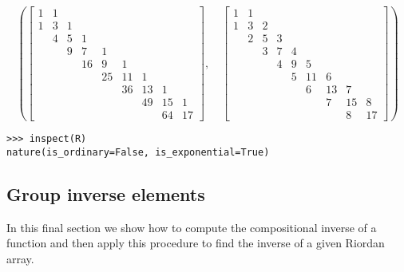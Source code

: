 \begin{example}
\begin{displaymath}
\left ( \left[\begin{matrix}1 & 1 &   &   &   &   &   &   &  \\1 & 3 & 1 &   &   &   &   &   &  \\  & 4 & 5 & 1 &   &   &   &   &  \\  &   & 9 & 7 & 1 &   &   &   &  \\  &   &   & 16 & 9 & 1 &   &   &  \\  &   &   &   & 25 & 11 & 1 &   &  \\  &   &   &   &   & 36 & 13 & 1 &  \\  &   &   &   &   &   & 49 & 15 & 1\\  &   &   &   &   &   &   & 64 & 17\end{matrix}\right], \quad \left[\begin{matrix}1 & 1 &   &   &   &   &   &   &  \\1 & 3 & 2 &   &   &   &   &   &  \\  & 2 & 5 & 3 &   &   &   &   &  \\  &   & 3 & 7 & 4 &   &   &   &  \\  &   &   & 4 & 9 & 5 &   &   &  \\  &   &   &   & 5 & 11 & 6 &   &  \\  &   &   &   &   & 6 & 13 & 7 &  \\  &   &   &   &   &   & 7 & 15 & 8\\  &   &   &   &   &   &   & 8 & 17\end{matrix}\right]\right )
\end{displaymath}
\begin{verbatim}
>>> inspect(R)
nature(is_ordinary=False, is_exponential=True)
\end{verbatim}
\end{example}

\subsection{Group inverse elements}

In this final section we show how to compute the compositional inverse of
a function and then apply this procedure to find the inverse of a given
Riordan array.

